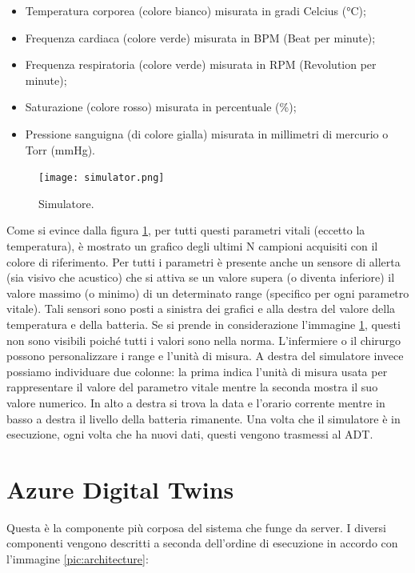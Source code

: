 \begin{itemize}
    \item Temperatura corporea (colore bianco) misurata in gradi Celcius (°C);
    \item Frequenza cardiaca (colore verde) misurata in BPM (Beat per minute);
    \item Frequenza respiratoria (colore verde) misurata in RPM (Revolution per minute);
    \item Saturazione (colore rosso) misurata in percentuale (\%);
    \item Pressione sanguigna (di colore gialla) misurata in millimetri di mercurio o Torr (mmHg).
\end{itemize}

\begin{figure}[ht]
    \texttt{[image: simulator.png]}
    \centering
    \caption{\label{pic:simulator}Simulatore.}
\end{figure}

Come si evince dalla figura \ref{pic:simulator}, per tutti questi parametri vitali (eccetto la temperatura), è mostrato un grafico degli ultimi N campioni acquisiti con il colore di riferimento. \newline \newline Per tutti i parametri è presente anche un sensore di allerta (sia visivo che acustico) che si attiva se un valore supera (o diventa inferiore) il valore massimo (o minimo) di un determinato range (specifico per ogni parametro vitale). Tali sensori sono posti a sinistra dei grafici e alla destra del valore della temperatura e della batteria. Se si prende in considerazione l'immagine \ref{pic:simulator}, questi non sono visibili poiché tutti i valori sono nella norma. L'infermiere o il chirurgo possono personalizzare i range e l'unità di misura. \newline \newline A destra del simulatore invece possiamo individuare due colonne: la prima indica l'unità di misura usata per rappresentare il valore del parametro vitale mentre la seconda mostra il suo valore numerico. In alto a destra si trova la data e l'orario corrente mentre in basso a destra il livello della batteria rimanente.
\newline \newline Una volta che il simulatore è in esecuzione, ogni volta che ha nuovi dati, questi vengono trasmessi al ADT.

\section{Azure Digital Twins}
Questa è la componente più corposa del sistema che funge da server. I diversi componenti vengono descritti a seconda dell'ordine di esecuzione in accordo con l'immagine \ref{pic:architecture}:

